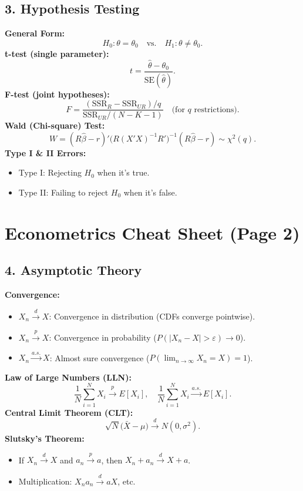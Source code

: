 \documentclass[a4paper,10pt]{article}
\begin{document}
\subsection*{3. Hypothesis Testing}
\textbf{General Form:} 
\[
H_0: \theta = \theta_0 \quad \text{vs.}\quad H_1: \theta \neq \theta_0.
\]
\textbf{t-test (single parameter):}
\[
t = \frac{\hat{\theta} - \theta_0}{\mathrm{SE}(\hat{\theta})}.
\]
\textbf{F-test (joint hypotheses):}
\[
F 
= \frac{(\mathrm{SSR}_R - \mathrm{SSR}_{UR})/q}{\mathrm{SSR}_{UR}/(N - K - 1)}
\quad \text{(for $q$ restrictions).}
\]
\textbf{Wald (Chi-square) Test:}
\[
W 
= (R\hat{\beta} - r)'\bigl(R(X'X)^{-1}R'\bigr)^{-1}(R\hat{\beta} - r)
\sim \chi^2(q).
\]
\textbf{Type I \& II Errors:}
\begin{itemize}
\item Type I: Rejecting $H_0$ when it’s true.
\item Type II: Failing to reject $H_0$ when it’s false.
\end{itemize}

\pagebreak  %

\section*{\centering Econometrics Cheat Sheet (Page 2)}

\subsection*{4. Asymptotic Theory}
\textbf{Convergence:}
\begin{itemize}
\item $X_n \xrightarrow{d} X$: Convergence in distribution 
  (CDFs converge pointwise).
\item $X_n \xrightarrow{p} X$: Convergence in probability 
  ($P(|X_n - X| > \varepsilon) \to 0$).
\item $X_n \xrightarrow{a.s.} X$: Almost sure convergence 
  ($P(\lim_{n\to\infty} X_n = X)=1$).
\end{itemize}

\textbf{Law of Large Numbers (LLN):}
\[
\frac{1}{N}\sum_{i=1}^N X_i \xrightarrow{p} E[X_i],\quad
\frac{1}{N}\sum_{i=1}^N X_i \xrightarrow{a.s.} E[X_i].
\]
\textbf{Central Limit Theorem (CLT):}
\[
\sqrt{N}\bigl(\bar{X} - \mu\bigr) \xrightarrow{d} 
N(0, \sigma^2).
\]
\textbf{Slutsky's Theorem:}
\begin{itemize}
\item If $X_n \xrightarrow{d} X$ and $a_n \xrightarrow{p} a$, then 
  $X_n + a_n \xrightarrow{d} X + a$.
\item Multiplication: 
  $X_n a_n \xrightarrow{d} aX$, etc.
\end{itemize}
\end{document}
